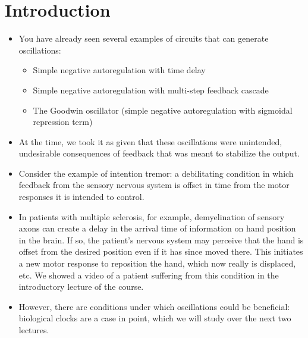 \documentclass{article}
\begin{document}
\large

\section*{Introduction}

\begin{itemize}
\item You have already seen several examples of circuits that can generate oscillations:
\begin{itemize}
\item Simple negative autoregulation with time delay
\item Simple negative autoregulation with multi-step feedback cascade
\item The Goodwin oscillator (simple negative autoregulation with sigmoidal repression term)
\end{itemize}

\item At the time, we took it as given that these oscillations were unintended, undesirable consequences of feedback that was meant to stabilize the output.

\item Consider the example of intention tremor: a debilitating condition in which feedback from the sensory nervous system is offset in time from the motor responses it is intended to control.

\item In patients with multiple sclerosis, for example, demyelination of sensory axons can create a delay in the arrival time of information on hand position in the brain. If so, the patient's nervous system may perceive that the hand is offset from the desired position even if it has since moved there. This initiates a new motor response to reposition the hand, which now really is displaced, etc. We showed a video of a patient suffering from this condition in the introductory lecture of the course.

\item However, there are conditions under which oscillations could be beneficial: biological clocks are a case in point, which we will study over the next two lectures.

\end{itemize}
\end{document}
